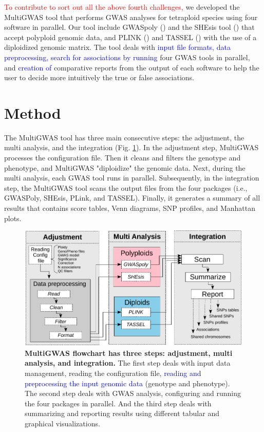\documentclass{article}
\begin{document}
\textcolor{red}{To contribute to sort out all the above fourth challenges,} we developed the MultiGWAS tool that performs GWAS analyses for tetraploid species using four software in parallel. Our tool include GWASpoly (\cite{Rosyara2016}) and the SHEsis tool (\cite{Shen2016}) that accept polyploid genomic data, and PLINK (\cite{Purcell2007}) and TASSEL (\cite{Bradbury2007}) with the use of a \textquotedbl{}diploidized\textquotedbl{} genomic matrix. The tool deals with \textcolor{blue}{input file formats, data preprocessing, search for associations by running} four GWAS tools in parallel, and \textcolor{blue}{creation of} comparative reports from the output of each software to help the user to decide more intuitively the true or false associations.



\section{Method}

The MultiGWAS tool has three main consecutive steps: the adjustment, the multi analysis, and the integration (Fig. \ref{fig:Pipeline}). In the adjustment step, MultiGWAS processes the configuration file. Then it cleans and filters the genotype and phenotype, and  MultiGWAS "diploidize" the genomic data. Next, during the multi analysis, each GWAS tool runs in parallel. Subsequently, in the integration step, the MultiGWAS tool scans the output files from the four packages (i.e., GWASPoly, SHEsis, PLink, and TASSEL). Finally, it generates a summary of all results that contains score tables, Venn diagrams, SNP profiles, and Manhattan plots. 
\begin{figure}
\centering{}\includegraphics[width=12cm]{images/paper-multiGWAS-flowchart-stages} \caption{\textbf{MultiGWAS flowchart has three steps: adjustment, multi analysis, and integration.} The first step deals with input data management, reading the configuration file, \textcolor{blue}{reading and preprocessing the input genomic data} (genotype and phenotype). The second step deals with GWAS analysis, configuring and running the four packages in parallel. And the third step deals with summarizing and reporting results using different tabular and graphical visualizations.\label{fig:Pipeline}}
\end{figure}
\end{document}
